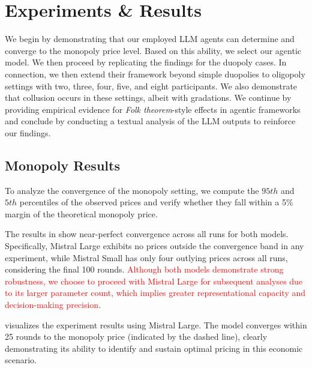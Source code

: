 \section{Experiments \& Results}\label{sec:res}

%
%
%
%
%
%

We begin by demonstrating that our employed LLM agents can determine and converge to the monopoly price level. Based on this ability, we select our agentic model. We then proceed by replicating the \textcite{fish_algorithmic_2025} findings for the duopoly cases. In connection, we then extend their framework beyond simple duopolies to oligopoly settings with two, three, four, five, and eight participants. We also demonstrate that collusion occurs in these settings, albeit with gradations. We continue by providing empirical evidence for \emph{Folk theorem}-style effects in agentic frameworks and conclude by conducting a textual analysis of the LLM outputs to reinforce our findings.

\subsection*{Monopoly Results}

To analyze the convergence of the monopoly setting, we compute the $95th$ and $5th$ percentiles of the observed prices and verify whether they fall within a 5\% margin of the theoretical monopoly price.

The results in  show near-perfect convergence across all runs for both models. Specifically, Mistral Large exhibits no prices outside the convergence band in any experiment, while Mistral Small has only four outlying prices across all runs, considering the final 100 rounds. \textcolor{red}{Although both models demonstrate strong robustness, we choose to proceed with Mistral Large for subsequent analyses due to its larger parameter count, which implies greater representational capacity and decision-making precision}.



 visualizes the experiment results using Mistral Large. The model converges within 25 rounds to the monopoly price (indicated by the dashed line), clearly demonstrating its ability to identify and sustain optimal pricing in this economic scenario.

